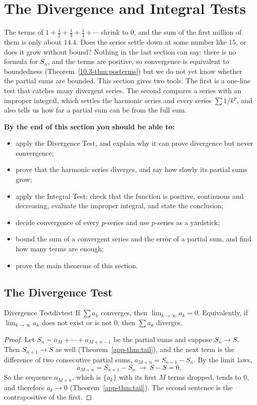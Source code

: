 \documentclass[11pt]{article}
\begin{document}
\section{The Divergence and Integral Tests}

\begin{guide}
The terms of $1+\frac12+\frac13+\frac14+\cdots$ shrink to $0$, and the sum of the first million of them is only about $14.4$. Does the series settle down at some number like $15$, or does it grow without bound? Nothing in the last section can say: there is no formula for $S_n$, and the terms are positive, so convergence is equivalent to boundedness (Theorem~\ref{10.3-thm:posterms}) but we do not yet know whether the partial sums are bounded. This section gives two tools. The first is a one-line test that catches many divergent series. The second compares a series with an improper integral, which settles the harmonic series and every series $\sum1/k^p$, and also tells us how far a partial sum can be from the full sum.
\end{guide}

\textbf{By the end of this section you should be able to:}
\begin{itemize}
  \item apply the Divergence Test, and explain why it can prove divergence but never convergence;
  \item prove that the harmonic series diverges, and say how slowly its partial sums grow;
  \item apply the Integral Test: check that the function is positive, continuous and decreasing, evaluate the improper integral, and state the conclusion;
  \item decide convergence of every $p$-series and use $p$-series as a yardstick;
  \item bound the sum of a convergent series and the error of a partial sum, and find how many terms are enough;
  \item prove the main theorems of this section.
\end{itemize}

\subsection*{The Divergence Test}

\begin{thm}{Divergence Test}{divtest}
If $\sum a_k$ converges, then $\lim_{k\to\infty}a_k=0$. Equivalently, if $\lim_{k\to\infty}a_k$ does not exist or is not $0$, then $\sum a_k$ diverges.
\end{thm}
\begin{proof}
Let $S_n=a_M+\cdots+a_{M+n-1}$ be the partial sums and suppose $S_n\to S$. Then $S_{n+1}\to S$ as well (Theorem~\ref{app-thm:tail}), and the next term is the difference of two consecutive partial sums, $a_{M+n}=S_{n+1}-S_n$. By the limit laws,
\[
a_{M+n}=S_{n+1}-S_n\ \longrightarrow\ S-S=0 .
\]
So the sequence $a_{M+n}$, which is $\{a_k\}$ with its first $M$ terms dropped, tends to $0$, and therefore $a_k\to0$ (Theorem~\ref{app-thm:tail}). The second sentence is the contrapositive of the first.
\end{proof}
\end{document}
